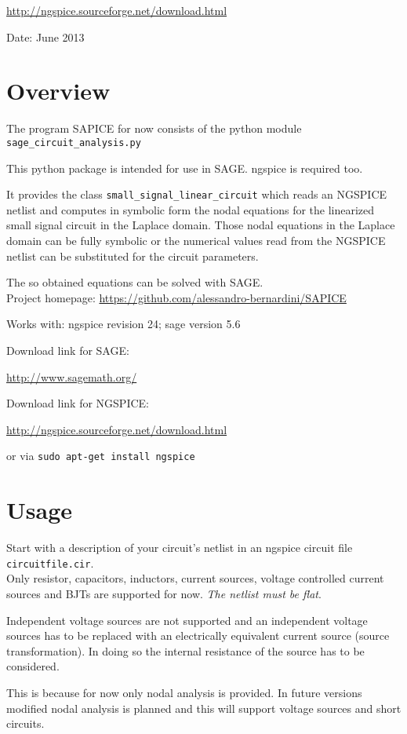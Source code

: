 \documentclass[a4paper]{article}
\begin{document}
\url{http://ngspice.sourceforge.net/download.html}


Date: June 2013
\section{Overview}

The program SAPICE for now consists of the python module {\tt sage\_circuit\_analysis.py}

This python package is intended for use in SAGE. ngspice is required too.

It provides the class  {\tt small\_signal\_linear\_circuit} which reads an NGSPICE netlist and computes in symbolic form the nodal equations for the linearized small signal circuit in the Laplace domain. Those nodal equations in the Laplace domain can be fully symbolic or the numerical values read from the NGSPICE netlist can be substituted for the circuit parameters.

The so obtained equations can be solved with SAGE.\\

Project homepage:
\url{https://github.com/alessandro-bernardini/SAPICE}

Works with: ngspice revision 24; sage version 5.6

Download link for SAGE:

\url{http://www.sagemath.org/}

Download link for NGSPICE:

\url{http://ngspice.sourceforge.net/download.html}

or via {\tt sudo apt-get install ngspice}

\section{Usage}
Start with a description of your circuit's netlist in an ngspice circuit file {\tt circuitfile.cir}.\\

Only resistor, capacitors, inductors, current sources, voltage controlled current sources and BJTs are supported for now. \emph{The netlist must be flat}.

Independent voltage sources are not supported and an independent voltage sources has to be replaced with an electrically equivalent current source (source transformation). In doing so the internal resistance of the source has to be considered.

This is because for now only nodal analysis is provided. In future versions modified nodal analysis is planned and this will support voltage sources and short circuits.
\end{document}
